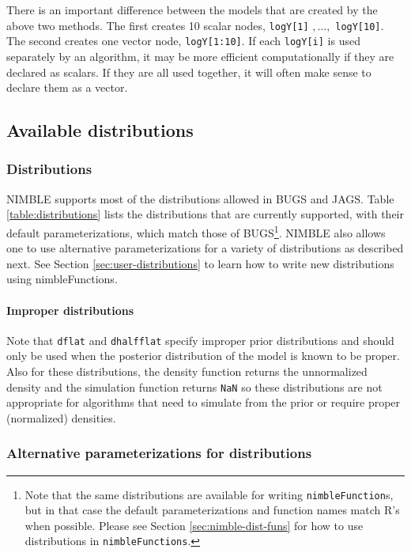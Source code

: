 \documentclass[12pt,oneside]{book}\usepackage[]{graphicx}\usepackage[]{color}
\def\cd#1{\texttt{#1}}
\begin{document}
There is an important difference between the models that are created by the
above two methods.  The first creates 10 scalar nodes, \cd{logY[1]}
$,\ldots,$ \cd{logY[10]}.  The second creates one vector node,
\cd{logY[1:10]}.  If each \cd{logY[i]} is used separately by an algorithm, it may be more efficient computationally if they are declared as scalars.  If they are all used together,
it will often make sense to declare them as a vector.


\subsection{Available distributions}
\label{subsec:dists-and-functions}
\subsubsection{Distributions}
\label{subsec:distributions}

NIMBLE supports most of the distributions allowed in BUGS and
JAGS. Table \ref{table:distributions} lists the distributions that are
currently supported, with their default parameterizations, which match
those of BUGS\footnote{Note that the same distributions are available
  for writing \cd{nimbleFunction}s, but in that case the default
  parameterizations and function names match R's when possible. Please
  see Section \ref{sec:nimble-dist-funs} for how to use distributions
  in \cd{nimbleFunctions}.}. NIMBLE also allows one to use alternative
parameterizations for a variety of distributions as described next.
See Section \ref{sec:user-distributions} to learn how to write new distributions using nimbleFunctions.



\paragraph{Improper distributions}

Note that \cd{dflat} and \cd{dhalfflat} specify improper prior distributions
and should only be used when the posterior distribution of the model is known to be proper.
Also for these distributions, the density function returns the unnormalized density
and the simulation function returns \cd{NaN} so these distributions
are not appropriate for algorithms that need to simulate from the
prior or require proper (normalized) densities.

\subsubsection{Alternative parameterizations for distributions}
\label{subsec:alternative-params}
\end{document}
